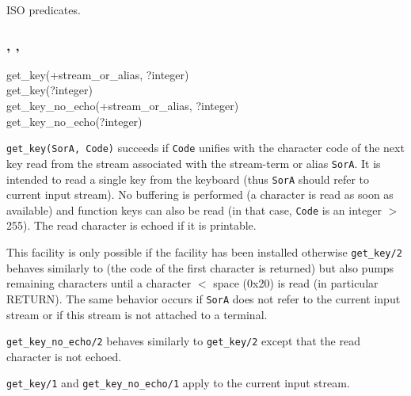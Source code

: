 \Portability

ISO predicates.

\subsubsection{,
	       ,
               }

\begin{TemplatesOneCol}
get\_key(+stream\_or\_alias, ?integer)\\
get\_key(?integer)\\
get\_key\_no\_echo(+stream\_or\_alias, ?integer)\\
get\_key\_no\_echo(?integer)

\end{TemplatesOneCol}

\Description

\texttt{get\_key(SorA, Code)} succeeds if \texttt{Code} unifies with the
character code of the next key read from the stream associated with the
stream-term or alias \texttt{SorA}. It is intended to read a single key from
the keyboard (thus \texttt{SorA} should refer to current input stream). No
buffering is performed (a character is read as soon as available) and
function keys can also be read (in that case, \texttt{Code} is an integer $>$
255). The read character is echoed if it is printable.

This facility is only possible if the  facility has been
installed  otherwise \texttt{get\_key/2} behaves
similarly to   (the code of the first
character is returned) but also pumps remaining characters until a character
$<$ space (0x20) is read (in particular RETURN). The same behavior
occurs if \texttt{SorA} does not refer to the current input stream or if
this stream is not attached to a terminal.

\texttt{get\_key\_no\_echo/2} behaves similarly to \texttt{get\_key/2}
except that the read character is not echoed.

\texttt{get\_key/1} and \texttt{get\_key\_no\_echo/1} apply to the current
input stream.

